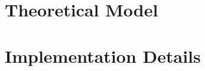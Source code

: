 \documentclass[12pt]{article}
\begin{document}
\section*{Theoretical Model}

\section*{Implementation Details}
\end{document}
